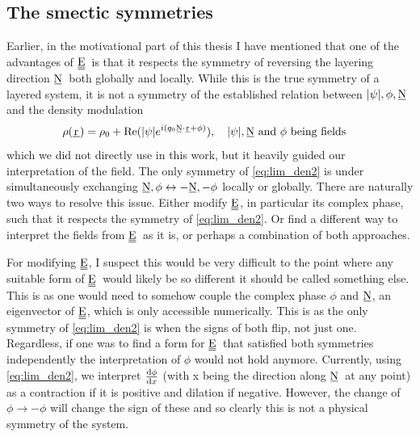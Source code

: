 \documentclass[12pt]{article}
\newcommand\barbelow[1]{\stackunder[1.2pt]{#1}{\rule{1.5ex}{.1ex}}}
\newcommand{\su}[1]{\barbelow{#1}}
\newcommand{\du}[1]{\barbelow{\barbelow{#1}}}
\newcommand{\ssu}[1]{\scriptsize\barbelow{#1}\normalsize}
\newcommand{\NN}{$\su{N}$}
\newcommand{\EE}{$\du{E}$}
\begin{document}
\subsection{The smectic symmetries}
Earlier, in the motivational part of this thesis I have mentioned that one of the advantages of \EE\ is that it respects the symmetry of reversing the layering direction \NN\ both globally and locally.
While this is the true symmetry of a layered system, it is not a symmetry of the established relation between $|\psi|,\phi,\su{N}$ and the density modulation
\begin{equation}\label{eq:lim_den2}
    \rho(\su{r}) = \rho_0 + \Re(|\psi| e^{i(q_0\ssu{N}\cdot\ssu{r} + \phi)}), \qq{$|\psi|,\su{N}$ and $\phi$ being fields}
\end{equation}
which we did not directly use in this work, but it heavily guided our interpretation of the field.
The only symmetry of \cref{eq:lim_den2} is under simultaneously exchanging $\su{N}, \phi \leftrightarrow -\su{N}, -\phi$ locally or globally.
There are naturally two ways to resolve this issue.
Either modify \EE, in particular its complex phase, such that it respects the symmetry of \cref{eq:lim_den2}.
Or find a different way to interpret the fields from \EE\ as it is, or perhaps a combination of both approaches.

For modifying \EE, I suspect this would be very difficult to the point where any suitable form of \EE\ would likely be so different it should be called something else.
This is as one would need to somehow couple the complex phase $\phi$ and \NN, an eigenvector of \EE, which is only accessible numerically.
This is as the only symmetry of \cref{eq:lim_den2} is when the signs of both flip, not just one.
Regardless, if one was to find a form for \EE\ that satisfied both symmetries independently the interpretation of $\phi$ would not hold anymore.
Currently, using \cref{eq:lim_den2}, we interpret $\dv{\phi}{x}$ (with x being the direction along \NN\ at any point) as a contraction if it is positive and dilation if negative.
However, the change of $\phi \rightarrow -\phi$ will change the sign of these and so clearly this is not a physical symmetry of the system.
\end{document}
